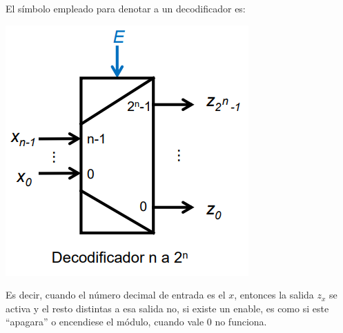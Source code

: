 \documentclass[a4paper,10pt]{book}
\begin{document}
El símbolo empleado para denotar a un decodificador es:
\begin{center}
\includegraphics[scale=0.65]{deco}
\end{center}
Es decir, cuando el número decimal de entrada es el $x$, entonces la salida $z_x$ se activa y el resto distintas a esa salida no, si existe un enable, es como si este ``apagara'' o encendiese el módulo, cuando vale 0 no funciona.\par
\end{document}
